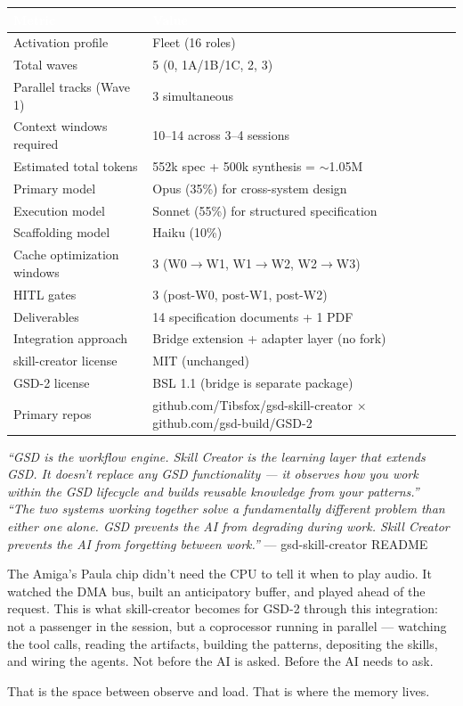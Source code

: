 \documentclass[11pt,letterpaper]{article}
\newcommand{\tableheader}[1]{\textbf{\sffamily\textcolor{white}{#1}}}
\begin{document}
\begin{center}
\begin{tabularx}{\textwidth}{L{5.5cm}X}
\toprule
{}
\tableheader{Metric} & \tableheader{Value} \\
\midrule
Activation profile & Fleet (16 roles) \\
Total waves & 5 (0, 1A/1B/1C, 2, 3) \\
Parallel tracks (Wave 1) & 3 simultaneous \\
Context windows required & 10--14 across 3--4 sessions \\
Estimated total tokens & 552k spec + 500k synthesis = $\sim$1.05M \\
Primary model & Opus (35\%) for cross-system design \\
Execution model & Sonnet (55\%) for structured specification \\
Scaffolding model & Haiku (10\%) \\
Cache optimization windows & 3 (W0$\to$W1, W1$\to$W2, W2$\to$W3) \\
HITL gates & 3 (post-W0, post-W1, post-W2) \\
Deliverables & 14 specification documents + 1 PDF \\
Integration approach & Bridge extension + adapter layer (no fork) \\
skill-creator license & MIT (unchanged) \\
GSD-2 license & BSL 1.1 (bridge is separate package) \\
Primary repos & github.com/Tibsfox/gsd-skill-creator $\times$ github.com/gsd-build/GSD-2 \\
\bottomrule
\end{tabularx}
\end{center}

\vspace{2em}

\begin{quotebox}
\textit{``GSD is the workflow engine. Skill Creator is the learning layer that extends GSD. It doesn't replace any GSD functionality --- it observes how you work within the GSD lifecycle and builds reusable knowledge from your patterns.''}\\[0.3em]
\textit{``The two systems working together solve a fundamentally different problem than either one alone. GSD prevents the AI from degrading during work. Skill Creator prevents the AI from forgetting between work.''} --- gsd-skill-creator README

\medskip

The Amiga's Paula chip didn't need the CPU to tell it when to play audio. It watched the DMA bus, built an anticipatory buffer, and played ahead of the request. This is what skill-creator becomes for GSD-2 through this integration: not a passenger in the session, but a coprocessor running in parallel --- watching the tool calls, reading the artifacts, building the patterns, depositing the skills, and wiring the agents. Not before the AI is asked. Before the AI needs to ask.

That is the space between observe and load. That is where the memory lives.
\end{quotebox}
\end{document}
